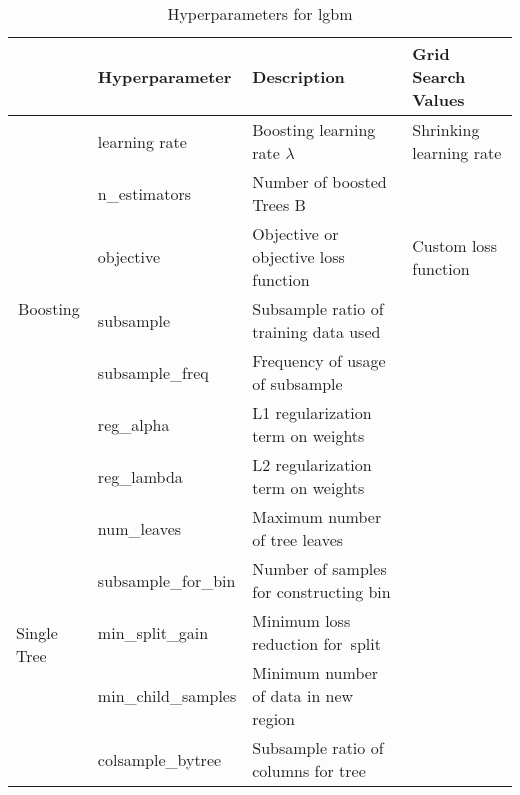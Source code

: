 \documentclass[12pt,titlepage]{article}
\begin{document}
\setlength{\tabcolsep}{10pt} %
\renewcommand{\arraystretch}{1.5}

\begin{table} \label{hp_lgbm}
    \centering
    \caption{Hyperparameters for lgbm}
    \begin{tabular}{c|l|l|l|} 
    \hline
    \multicolumn{1}{l|}{}                                       & Hyperparameter      & Description                                                                                      & Grid Search Values       \\ 
    \hline
    \multirow{7}{*}{\begin{sideways} Boosting \end{sideways}}                         & learning rate       & Boosting learning rate $\lambda$                                                                & Shrinking learning rate  \\
    & n\_estimators       & Number of boosted Trees B              &                          \\
    & objective           & Objective or objective loss function   & Custom loss function     \\
    & subsample           & Subsample ratio of training data used  &                          \\
    & subsample\_freq     & Frequency of usage of subsample        &                          \\
    & reg\_alpha          & L1 regularization term on weights      &                          \\
    & reg\_lambda         & L2 regularization term on weights      &                          \\
    \hline
    \multicolumn{1}{l|}{\multirow{5}{*}{\begin{sideways} Single Tree \end{sideways}}} & num\_leaves         & Maximum number of tree leaves          &                          \\
    \multicolumn{1}{l|}{}                                       & subsample\_for\_bin & Number of samples for constructing bin &                          \\
    \multicolumn{1}{l|}{}                                       & min\_split\_gain    & Minimum loss reduction for~split       &                          \\
    \multicolumn{1}{l|}{}                                       & min\_child\_samples & Minimum number of data in new region   &                          \\
    \multicolumn{1}{l|}{}                                       & colsample\_bytree   & Subsample ratio of columns for tree    &                          \\
    \hline
    \end{tabular}
\end{table}
\end{document}
